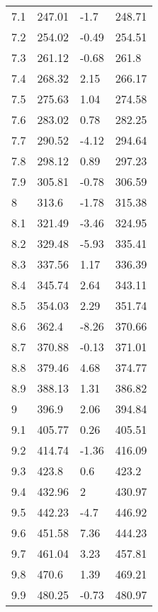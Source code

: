 \documentclass{article}
\begin{document}
\begin{center}
\begin{longtable}{|l|l|l|l|}
			7.1 & 247.01 & -1.7 & 248.71 \\ 
			7.2 & 254.02 & -0.49 & 254.51 \\ 
			7.3 & 261.12 & -0.68 & 261.8 \\ 
			7.4 & 268.32 & 2.15 & 266.17 \\ 
			7.5 & 275.63 & 1.04 & 274.58 \\ 
			7.6 & 283.02 & 0.78 & 282.25 \\ 
			7.7 & 290.52 & -4.12 & 294.64 \\ 
			7.8 & 298.12 & 0.89 & 297.23 \\ 
			7.9 & 305.81 & -0.78 & 306.59 \\ 
			8 & 313.6 & -1.78 & 315.38 \\ 
			8.1 & 321.49 & -3.46 & 324.95 \\ 
			8.2 & 329.48 & -5.93 & 335.41 \\ 
			8.3 & 337.56 & 1.17 & 336.39 \\ 
			8.4 & 345.74 & 2.64 & 343.11 \\ 
			8.5 & 354.03 & 2.29 & 351.74 \\ 
			8.6 & 362.4 & -8.26 & 370.66 \\ 
			8.7 & 370.88 & -0.13 & 371.01 \\ 
			8.8 & 379.46 & 4.68 & 374.77 \\ 
			8.9 & 388.13 & 1.31 & 386.82 \\ 
			9 & 396.9 & 2.06 & 394.84 \\ 
			9.1 & 405.77 & 0.26 & 405.51 \\ 
			9.2 & 414.74 & -1.36 & 416.09 \\ 
			9.3 & 423.8 & 0.6 & 423.2 \\ 
			9.4 & 432.96 & 2 & 430.97 \\ 
			9.5 & 442.23 & -4.7 & 446.92 \\ 
			9.6 & 451.58 & 7.36 & 444.23 \\ 
			9.7 & 461.04 & 3.23 & 457.81 \\ 
			9.8 & 470.6 & 1.39 & 469.21 \\ 
			9.9 & 480.25 & -0.73 & 480.97 \\ 
			
		\end{longtable}
	\end{center}
	
\end{document}
